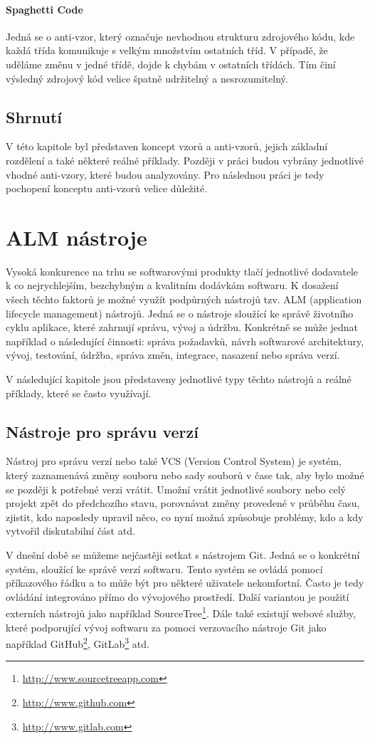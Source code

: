 \documentclass[czech,DP]{thesiskiv}
\begin{document}
\subsubsection{Spaghetti Code}
Jedná se o anti-vzor, který označuje nevhodnou strukturu zdrojového kódu, kde každá třída komunikuje s velkým množstvím ostatních tříd. V případě, že uděláme změnu v jedné třídě, dojde k chybám v ostatních třídách. Tím činí výsledný zdrojový kód velice špatně udržitelný a nesrozumitelný.
\section{Shrnutí}
V této kapitole byl představen koncept vzorů a anti-vzorů, jejich základní rozdělení a také některé reálné příklady. Později v práci budou vybrány jednotlivé vhodné anti-vzory, které budou analyzovány. Pro následnou práci je tedy pochopení konceptu anti-vzorů velice důležité.


\chapter{ALM nástroje}
Vysoká konkurence na trhu se softwarovými produkty tlačí jednotlivé dodavatele k co nejrychlejším, bezchybným a kvalitním dodávkám softwaru. K dosažení všech těchto faktorů je možné využít podpůrných nástrojů tzv. ALM (application lifecycle management) nástrojů. Jedná se o nástroje sloužící ke správě životního cyklu aplikace, které zahrnují správu, vývoj a údržbu. Konkrétně se může jednat například o následující činnosti: správa požadavků, návrh softwarové architektury, vývoj, testování, údržba, správa změn, integrace, nasazení nebo správa verzí.
\par
V následující kapitole jsou představeny jednotlivé typy těchto nástrojů a reálné příklady, které se často využívají.
\section{Nástroje pro správu verzí}
Nástroj pro správu verzí nebo také VCS (Version Control System) je systém, který zaznamenává změny souboru nebo sady souborů v čase tak, aby bylo možné se později k potřebné verzi vrátit. Umožní vrátit jednotlivé soubory nebo celý projekt zpět do předchozího stavu, porovnávat změny provedené v průběhu času, zjistit, kdo naposledy upravil něco, co nyní možná způsobuje problémy, kdo a kdy vytvořil diskutabilní část atd.
\par
V dnešní době se můžeme nejčastěji setkat s nástrojem Git. Jedná se o konkrétní systém, sloužící ke správě verzí softwaru. Tento systém se ovládá pomocí příkazového řádku a to může být pro některé uživatele nekomfortní. Často je tedy ovládání integrováno přímo do vývojového prostředí. Další variantou je použití externích nástrojů jako například SourceTree\footnote{\url{http://www.sourcetreeapp.com}}. Dále také existují webové služby, které podporující vývoj softwaru za pomoci verzovacího nástroje Git jako například GitHub\footnote{\url{http://www.github.com}}, GitLab\footnote{\url{http://www.gitlab.com}} atd.
\end{document}
